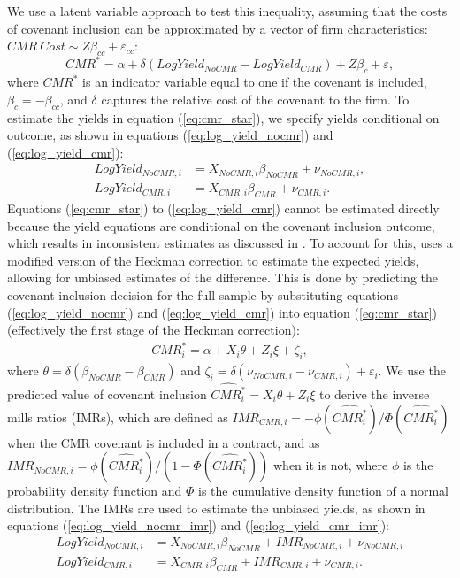 \documentclass[12pt]{article}
\begin{document}
\begin{appendices}
We use a latent variable approach to test this inequality, assuming that the costs of covenant inclusion can be approximated by a vector of firm characteristics: $CMR\ Cost \sim Z \beta_{cc} + \varepsilon_{cc}$: %
%
\begin{equation}\label{eq:cmr_star}
CMR^* = \alpha + \delta (LogYield_{NoCMR} - LogYield_{CMR} ) + Z \beta_{c} + \varepsilon,
\end{equation}%
%
where $CMR^*$ is an indicator variable equal to one if the covenant is included, $\beta_c = -\beta_{cc}$, and $\delta$ captures the relative cost of the covenant to the firm.
To estimate the yields in equation (\ref{eq:cmr_star}), we specify yields conditional on outcome, as shown in equations (\ref{eq:log_yield_nocmr}) and (\ref{eq:log_yield_cmr}):
\begin{align}
LogYield_{NoCMR,i} &= X_{NoCMR,i} \beta_{NoCMR} + \nu_{NoCMR,i}, \label{eq:log_yield_nocmr} \\
LogYield_{CMR,i} &= X_{CMR,i} \beta_{CMR} + \nu_{CMR,i}. \label{eq:log_yield_cmr}
\end{align}
Equations (\ref{eq:cmr_star}) to (\ref{eq:log_yield_cmr}) cannot be estimated directly because the yield equations are conditional on the covenant inclusion outcome, which results in inconsistent estimates as discussed in \cite{Heckman_1979}.
To account for this, \cite{Lee_1978} uses a modified version of the Heckman correction to estimate the expected yields, allowing for unbiased estimates of the difference.
This is done by predicting the covenant inclusion decision for the full sample by substituting equations (\ref{eq:log_yield_nocmr}) and (\ref{eq:log_yield_cmr}) into equation (\ref{eq:cmr_star}) (effectively the first stage of the Heckman correction): %
%
\begin{align} \label{eq:cmr_star_heckman}
    CMR^*_i = \alpha + X_i \theta + Z_i \xi + \zeta_i,
\end{align}%
%
where $\theta = \delta (\beta_{NoCMR} - \beta_{CMR})$ and $\zeta_i = \delta (\nu_{NoCMR,i} - \nu_{CMR,i}) + \varepsilon_{i}$.
We use the predicted value of covenant inclusion $\widehat{CMR^{*}_{i}} = X_i \theta + Z_i \xi$ to derive the inverse mills ratios (IMRs), which are defined as $IMR_{CMR,i} = -\phi (\widehat{CMR^{*}_{i}}) / \Phi(\widehat{CMR^{*}_{i}})$ when the CMR covenant is included in a contract, and as $IMR_{NoCMR,i} = \phi (\widehat{CMR^{*}_{i}}) / \left( 1 - \Phi(\widehat{CMR^{*}_{i}}) \right)$ when it is not, where $\phi$ is the probability density function and $\Phi$ is the cumulative density function of a normal distribution.
The IMRs are used to estimate the unbiased yields, as shown in equations (\ref{eq:log_yield_nocmr_imr}) and (\ref{eq:log_yield_cmr_imr}):
%
\begin{align}
    LogYield_{NoCMR,i} &= X_{NoCMR,i} \beta_{NoCMR} + IMR_{NoCMR,i} + \nu_{NoCMR,i}  \label{eq:log_yield_nocmr_imr} \\
    LogYield_{CMR,i} &= X_{CMR,i} \beta_{CMR} + IMR_{CMR,i} + \nu_{CMR,i}.  \label{eq:log_yield_cmr_imr}
\end{align}


\end{appendices}
\end{document}
